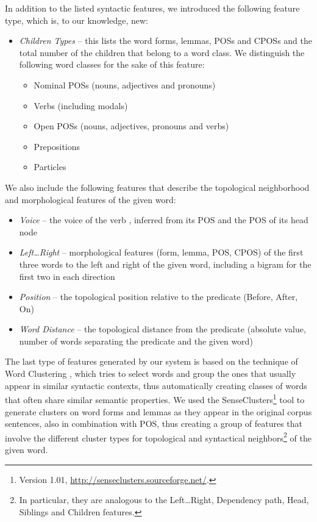 \documentclass[12pt,notitlepage]{report}
\begin{document}
In addition to the listed syntactic features, we introduced the following feature type, which is, to our knowledge, new:
\begin{itemize}
    \item \emph{Children Types} -- this lists the word forms, lemmas, POSs and CPOSs and the total number of the children that belong to a word class. We distinguish the following word classes for the sake of this feature:
    \begin{itemize}
        \item Nominal POSs (nouns, adjectives and pronouns)
        \item Verbs (including modals)
        \item Open POSs (nouns, adjectives, pronouns and verbs)
        \item Prepositions
        \item Particles
    \end{itemize}
\end{itemize}

We also include the following features that describe the topological neighborhood and morphological features of the given word:
\begin{itemize}
    \item \emph{Voice} -- the voice of the verb \citep{che09}, inferred from its POS and the POS of its head node
    \item \emph{Left\dots Right} -- morphological features (form, lemma, POS, CPOS) of the first three words to the left and right of the given word, including a bigram for the first two in each direction
    \item \emph{Position} -- the topological position relative to the predicate (Before, After, On) \citep{nugues09}
    \item \emph{Word Distance} -- the topological distance from the predicate (absolute value, number of words separating the predicate and the given word) \citep{asahara09}
\end{itemize}

The last type of features generated by our system is based on the technique of Word Clustering \citep{pereira93}, which tries to select words and group the ones that usually appear in similar syntactic contexts, thus automatically creating classes of words that often share similar semantic properties. We used the SenseClusters\footnote{Version 1.01, \url{http://senseclusters.sourceforge.net/}.} tool \citep{kulkarni05} to generate clusters on word forms and lemmas as they appear in the original corpus sentences, also in combination with POS, thus creating a group of features that involve the different cluster types for topological and syntactical neighbors\footnote{In particular, they are analogous to the Left\dots Right, Dependency path, Head, Siblings and Children features.} of the given word.
\end{document}
